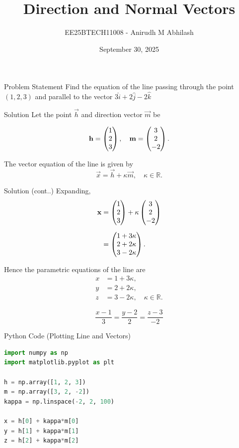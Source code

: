 \documentclass{beamer}
\title{Direction and Normal Vectors}
\author{EE25BTECH11008 - Anirudh M Abhilash}
\date{September 30, 2025}
\begin{document}
\begin{frame}
\titlepage
\end{frame}

\begin{frame}{Problem Statement}
Find the equation of the line passing through the point $(1,2,3)$ and parallel to the vector $3\hat{i} + 2\hat{j} - 2\hat{k}$
\end{frame}

\begin{frame}{Solution}
Let the point $\vec{h}$ and direction vector $\vec{m}$ be  

\[
\mathbf{h} = \begin{pmatrix}1 \\ 2 \\ 3\end{pmatrix}, \quad 
\mathbf{m} = \begin{pmatrix}3 \\ 2 \\ -2\end{pmatrix}.
\]

The vector equation of the line is given by
\[
\vec{x} = \vec{h} + \kappa \vec{m}, \quad \kappa \in \mathbb{R}.
\]

\end{frame}

\begin{frame}{Solution (cont..)}
Expanding,  
\begin{align}
\mathbf{x} &= \begin{pmatrix}1 \\ 2 \\ 3\end{pmatrix} + \kappa \begin{pmatrix}3 \\ 2 \\ -2\end{pmatrix} \\[2mm]
           &= \begin{pmatrix}1 + 3\kappa \\ 2 + 2\kappa \\ 3 - 2\kappa\end{pmatrix}.
\end{align}

Hence the parametric equations of the line are  
\begin{align}
x &= 1 + 3\kappa, \\ 
y &= 2 + 2\kappa, \\ 
z &= 3 - 2\kappa, \quad \kappa \in \mathbb{R}.
\end{align}

\[
\boxed{\frac{x - 1}{3} = \frac{y - 2}{2} = \frac{z - 3}{-2}}
\]
\end{frame}

\begin{frame}[fragile]{Python Code (Plotting Line and Vectors)}
\begin{lstlisting}[language=Python]
import numpy as np
import matplotlib.pyplot as plt

h = np.array([1, 2, 3])
m = np.array([3, 2, -2])
kappa = np.linspace(-2, 2, 100)

x = h[0] + kappa*m[0]
y = h[1] + kappa*m[1]
z = h[2] + kappa*m[2]
\end{lstlisting}
\end{frame}
\end{document}
